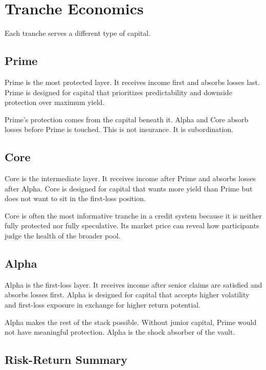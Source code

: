 \documentclass[11pt]{article}
\begin{document}
\section{Tranche Economics}

Each tranche serves a different type of capital.

\subsection{Prime}

Prime is the most protected layer. It receives income first and absorbs losses
last. Prime is designed for capital that prioritizes predictability and downside
protection over maximum yield.

Prime's protection comes from the capital beneath it. Alpha and Core absorb
losses before Prime is touched. This is not insurance. It is subordination.

\subsection{Core}

Core is the intermediate layer. It receives income after Prime and absorbs
losses after Alpha. Core is designed for capital that wants more yield than
Prime but does not want to sit in the first-loss position.

Core is often the most informative tranche in a credit system because it is
neither fully protected nor fully speculative. Its market price can reveal how
participants judge the health of the broader pool.

\subsection{Alpha}

Alpha is the first-loss layer. It receives income after senior claims are
satisfied and absorbs losses first. Alpha is designed for capital that accepts
higher volatility and first-loss exposure in exchange for higher return
potential.

Alpha makes the rest of the stack possible. Without junior capital, Prime would
not have meaningful protection. Alpha is the shock absorber of the vault.

\subsection{Risk-Return Summary}
\end{document}
